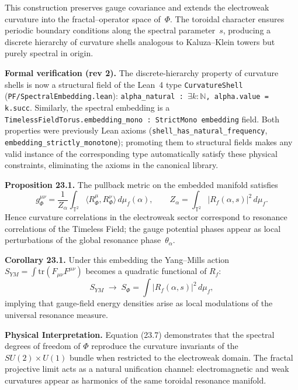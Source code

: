 This construction preserves gauge covariance and
extends the electroweak curvature into the fractal--operator space of~$\Phi$.
The toroidal character ensures periodic boundary conditions
along the spectral parameter~$s$,
producing a discrete hierarchy of curvature shells
analogous to Kaluza--Klein towers but purely spectral in origin.

\textbf{Formal verification (rev 2).} The discrete-hierarchy property of curvature shells is now a structural field of the Lean~4 type \texttt{CurvatureShell} (\texttt{PF/SpectralEmbedding.lean}): \texttt{alpha\_natural : $\exists k : \mathbb{N}$, alpha.value = k.succ}. Similarly, the spectral embedding is a \texttt{TimelessFieldTorus.embedding\_mono : StrictMono embedding} field. Both properties were previously Lean axioms (\texttt{shell\_has\_natural\_frequency}, \texttt{embedding\_strictly\_monotone}); promoting them to structural fields makes any valid instance of the corresponding type automatically satisfy these physical constraints, eliminating the axioms in the canonical library.

\vspace{0.5em}
\noindent\textbf{Proposition 23.1.}
The pullback metric on the embedded manifold satisfies
\[
g_{\Phi}^{\mu\nu} =
\frac{1}{Z_\alpha}
\int_{\mathbb{T}^2}
\!\!\langle R_\Phi^{\mu},R_\Phi^{\nu}\rangle\,d\mu_f(\alpha),
\qquad
Z_\alpha=\int_{\mathbb{T}^2}\!|R_f(\alpha,s)|^2\,d\mu_f.
\]
Hence curvature correlations in the electroweak sector correspond to
resonance correlations of the Timeless Field;
the gauge potential phases appear as local perturbations of
the global resonance phase~$\theta_\alpha$.

\vspace{0.5em}
\noindent\textbf{Corollary 23.1.}
Under this embedding the Yang--Mills action
\(
S_{YM}=\int \mathrm{tr}(F_{\mu\nu}F^{\mu\nu})
\)
becomes a quadratic functional of $R_f$:
\[
S_{YM}
\;\longrightarrow\;
S_{\Phi}
=\int |R_f(\alpha,s)|^{2}\,d\mu_f,
\]
implying that gauge-field energy densities
arise as local modulations of the universal resonance measure.

\vspace{0.5em}
\noindent\textbf{Physical Interpretation.}
Equation (23.7) demonstrates that the spectral degrees of freedom
of $\Phi$ reproduce the curvature invariants of
the $SU(2)\times U(1)$ bundle when restricted to the electroweak
domain.
The fractal projective limit acts as a natural unification channel:
electromagnetic and weak curvatures appear as harmonics of the same
toroidal resonance manifold.

